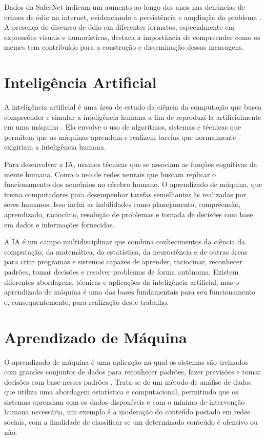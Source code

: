 Dados da SaferNet indicam um aumento ao longo dos anos nas denúncias de crimes de ódio na internet, evidenciando a persistência e ampliação do problema \cite{saferNetIndicadores}. A presença do discurso de ódio em diferentes formatos, especialmente em expressões visuais e humorísticas, destaca a importância de compreender como os memes tem contribuído para a construção e disseminação dessas mensagens.

\section{Inteligência Artificial}

A inteligência artificial é uma área de estudo da ciência da computação que busca compreender e simular a inteligência humana a fim de reproduzi-la artificialmente em uma máquina \cite{Haugeland1985}. Ela envolve o uso de algoritmos, sistemas e técnicas que permitem que as máquinas aprendam e realizem tarefas que normalmente exigiriam a inteligência humana.

Para desenvolver a IA, usamos técnicas que se associam as funções cognitivas da mente humana. Como o uso de redes neurais que buscam replicar o funcionamento dos neurônios no cérebro humano. O aprendizado de máquina, que treina computadores para desempenhar tarefas semelhantes às realizadas por seres humanos. Isso inclui as habilidades como planejamento, compreensão, aprendizado, raciocínio, resolução de problemas e tomada de decisões com base em dados e informações fornecidas.

A IA é um campo multidisciplinar que combina conhecimentos da ciência da computação, da matemática, da estatística, da neurociência e de outras áreas para criar programas e sistemas capazes de aprender, raciocinar, reconhecer padrões, tomar decisões e resolver problemas de forma autônoma. Existem diferentes abordagens, técnicas e aplicações da inteligência artificial, mas o aprendizado de máquina é uma das bases fundamentais para seu funcionamento e, consequentemente, para realização deste trabalho.

\section{Aprendizado de Máquina}

O aprendizado de máquina é uma aplicação na qual os sistemas são treinados com grandes conjuntos de dados para reconhecer padrões, fazer previsões e tomar decisões com base nesses padrões \cite{HoschMachineLearning}. Trata-se de um método de análise de dados que utiliza uma abordagem estatística e computacional, permitindo que os sistemas aprendam com os dados disponíveis e com o mínimo de intervenção humana necessária, um exemplo é a moderação do conteúdo postado em redes sociais, com a finalidade de classificar se um determinado conteúdo é ofensivo ou não.

